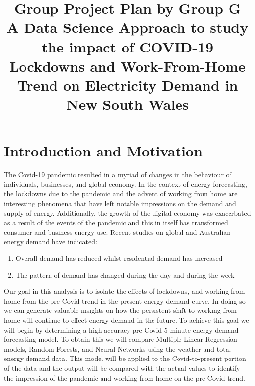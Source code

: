\documentclass[mstat,12pt]{unswthesis}
\title{Group Project Plan by Group G\\[0.5cm]A Data Science Approach to study the impact of COVID-19 Lockdowns and Work-From-Home Trend on Electricity Demand in New South Wales}
\author{\Authornameonly}
\begin{document}
\beforepreface





\afterpreface





%
%






\setcounter{chapter}{1}
\renewcommand\thesection{\arabic{section}}

\hypertarget{introduction-and-motivation}{%
\section{Introduction and
Motivation}\label{introduction-and-motivation}}

The Covid-19 pandemic resulted in a myriad of changes in the behaviour
of individuals, businesses, and global economy. In the context of energy
forecasting, the lockdowns due to the pandemic and the advent of working
from home are interesting phenomena that have left notable impressions on the demand and supply of energy. Additionally, the growth of the digital economy was exacerbated as a result of the events of the pandemic and this in itself has transformed consumer and business energy use. Recent studies on global and Australian energy demand have indicated:
\begin{enumerate}
  \item Overall demand has reduced whilst residential demand has increased
  \item The pattern of demand has changed during the day and during the week
\end{enumerate}

\bigskip

\noindent Our goal in this analysis is to isolate the effects of lockdowns, and working from home from the pre-Covid trend in the present energy demand curve. In doing so we can generate valuable insights on how the persistent shift to working from home will continue to effect energy demand in the future. To achieve this goal we will begin by determining a high-accuracy pre-Covid 5 minute energy demand forecasting model. To obtain this we will compare Multiple Linear Regression models, Random Forests, and Neural Networks using the weather and total energy demand data. This model will be applied to the Covid-to-present portion of the data and the output will be compared with the actual values to identify the impression of the pandemic and working from home on the pre-Covid trend.
\end{document}
